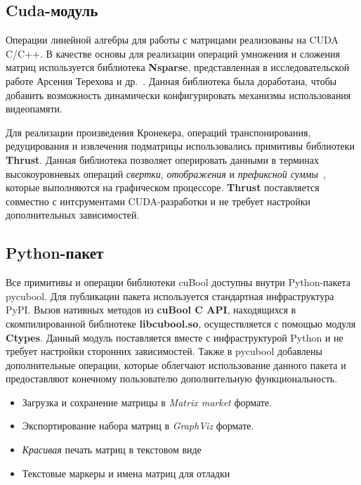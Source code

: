 \subsection{Cuda-модуль}

Операции линейной алгебры для работы с матрицами реализованы на CUDA C/C++. 
В качестве основы для реализации операций умножения и сложения матриц используется библиотека \textbf{Nsparse}, представленная в исследовательской работе Арсения Терехова и др.~\cite{inproceedings:cfqp_matrix_with_single_source}.
Данная библиотека была доработана, чтобы добавить возможность динамически конфигурировать механизмы использования видеопамяти. 

Для реализации произведения Кронекера, операций транспонирования, редуцирования и извлечения подматрицы использовались примитивы библиотеки \textbf{Thrust}.
Данная библиотека позволяет оперировать данными в терминах высокоуровневых операций \textit{свертки}, \textit{отображения} и \textit{префиксной суммы}~\cite{net:cuda_thrust}, которые выполняются на графическом процессоре. 
\textbf{Thrust} поставляется совместно с интсрументами CUDA-разработки и не требует настройки дополнительных зависимостей.

\subsection{Python-пакет}

Все примитивы и операции библиотеки cuBool доступны внутри Python-пакета pycubool.
Для публикации пакета используется стандартная инфраструктура PyPI.
Вызов нативных методов из \textbf{cuBool C API}, находящихся в скомпилированной библиотеке \textbf{libcubool.so}, осуществляется с помощью модуля \textbf{Ctypes}. 
Данный модуль поставляется вместе с инфраструктурой Python и не требует настройки сторонних зависимостей. 
Также в pycubool добавлены дополнительные операции, которые облегчают использование данного пакета и предоставляют конечному пользователю дополнительную функциональность.

\begin{itemize}[noitemsep,topsep=0pt,parsep=0pt,partopsep=0pt]
    \item Загрузка и сохранение матрицы в \textit{Matrix market} формате.
    \item Экспортирование набора матриц в \textit{GraphViz} формате.
    \item \textit{Красивая} печать матриц в текстовом виде
    \item Текстовые маркеры и имена матриц для отладки
\end{itemize}

